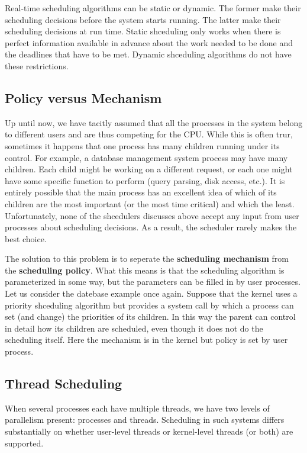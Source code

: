 \documentclass{book}
\newcommand {\kw}  [1] {\textbf{#1}}
\begin{document}
Real-time scheduling algorithms can be static or dynamic.
The former make their scheduling decisions before the system starts running.
The latter make their scheduling decisions at run time.
Static shceduling only works when there is perfect information available in advance 
about the work needed to be done and the deadlines that have to be met.
Dynamic shceduling algorithms do not have these restrictions.

\subsection{Policy versus Mechanism}
Up until now, we have tacitly assumed that all the processes in the system belong to different users and are thus competing for the CPU.
While this is often trur, sometimes it happens that one process has many children running under its control.
For example, a database management system process may have many children.
Each child might be working on a different request, or each one might have some specific function to perform (query parsing, disk access, etc.).
It is entirely possible that the main process has an excellent idea of 
which of its children are the most important (or the most time critical) and which the least.
Unfortunately, none of the shcedulers discusses above accept any input from user processes about scheduling decisions.
As a result, the scheduler rarely makes the best choice.

The solution to this problem is to seperate the \kw{scheduling mechanism} from the \kw{scheduling policy}.
What this means is that the scheduling algorithm is parameterized in some way, but the parameters can be filled in by user processes.
Let us consider the datebase example once again.
Suppose that the kernel uses a priority shceduling algorithm but provides a system call 
by which a process can set (and change) the priorities of its children.
In this way the parent can control in detail how its children are scheduled, even though it does not do the scheduling itself.
Here the mechanism is in the kernel but policy is set by user process.

\subsection{Thread Scheduling}
When several processes each have multiple threads, we have two levels of parallelism present: processes and threads.
Scheduling in such systems differs substantially on whether user-level threads or kernel-level threads (or both) are supported.
\end{document}
